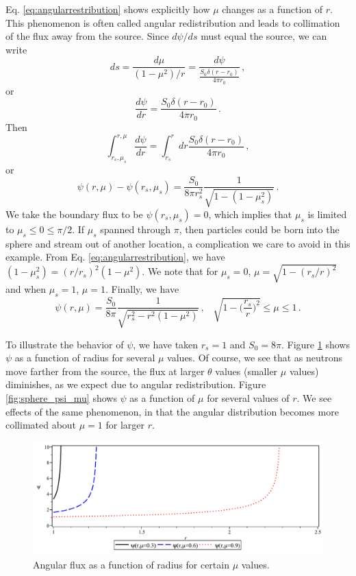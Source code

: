 Eq. \ref{eq:angularrestribution} shows explicitly how $\mu$ changes as a function of $r$.  This phenomenon is often called angular redistribution and leads to collimation of the flux away from the source.  Since $d\psi/ds$ must equal the source, we can write
\begin{equation}
 ds = \frac{d\mu}{ (1-\mu^2)/r } = \frac{d\psi}{ \frac{S_0\delta(r-r_0)}{4\pi r_0}  } \, ,
\end{equation}
or 
\begin{equation}
\frac{d\psi}{dr} = \frac{S_0\delta(r-r_0)}{4\pi r_0} \, .
\end{equation}
Then
\begin{equation}
 \int^{r,\mu}_{r_s,\mu_s} \frac{d\psi}{dr}  = \int^r_{r_s} dr \frac{S_0\delta(r-r_0)}{4\pi r_0} \, ,
\end{equation}
or
\begin{equation}
 \psi(r,\mu)-\psi(r_s,\mu_s) = \frac{S_0}{8\pi r^2_s} \frac{1}{\sqrt{1-(1-\mu^2_s)}} \, .
\end{equation}
We take the boundary flux to be $\psi(r_s,\mu_s) = 0$, which implies that $\mu_s$ is limited to $\mu_s \leq 0 \leq \pi/2$. If $\mu_s$ spanned through $\pi$, then particles could be born into the sphere and stream out of another location, a complication we care to avoid in this example.  From Eq. \ref{eq:angularrestribution}, we have $(1-\mu^2_s)=(r/r_s)^2(1-\mu^2)$.  We note that for $\mu_s = 0$, $\mu=\sqrt{1-(r_s/r)^2}$ and when $\mu_s=1$, $\mu=1$.  Finally, we have
\begin{equation}
 \psi(r,\mu) = \frac{S_0}{8\pi} \frac{1}{\sqrt{r^2_s - r^2(1-\mu^2)}} \, , \, \, \, \, \, \sqrt{1-\Big ( \frac{r_s}{r} \Big )^2 } \leq \mu \leq 1 \, .
 \label{eq:spherepsi}
\end{equation}

To illustrate the behavior of $\psi$, we have taken $r_s = 1$ and $S_0 = 8\pi$.  Figure \ref{fig:sphere_psi_radius} shows $\psi$ as a function of radius for several $\mu$ values.  Of course, we see that as neutrons move farther from the source, the flux at larger $\theta$ values (smaller $\mu$ values) diminishes, as we expect due to angular redistribution. Figure \ref{fig:sphere_psi_mu} shows $\psi$ as a function of $\mu$ for several values of $r$.  We see effects of the same phenomenon, in that the angular distribution becomes more collimated about $\mu = 1$ for larger $r$.
\begin{figure}[ht] 
    \centering
    \includegraphics[keepaspectratio, width = 5.0 in]{sphere_psi_radius}
    \caption{Angular flux as a function of radius for certain $\mu$ values.}
    \label{fig:sphere_psi_radius}
\end{figure}

